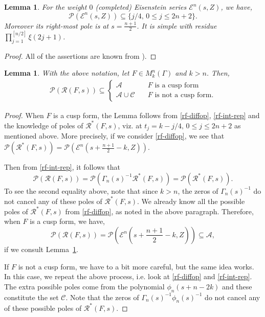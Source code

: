 \documentclass[12pt]{amsart}
\numberwithin{equation}{section}
\theoremstyle{plain}
\newtheorem{lem}[thm]{Lemma}
\theoremstyle{definition}
\newcommand{\q}{\quad}
\newcommand{\mc}{\mathcal}
\newcommand{\mcr}{\mathscr}
\newcommand{\mkngam}{M^n_k(\Gamma)}
\begin{document}
\begin{lem} \label{pole-eisen}
For the weight $0$ (completed) Eisenstein series $\mathscr E^n(s,Z) $, we have,
\[ \mathscr{P}( \mathscr E^n(s,Z) ) \subseteq \{  j/4, \, 0 \le j \le 2n+2 \} . \]
Moreover its right-most pole  is at $s=\frac{n+1}{2}$. It is simple with residue $\prod_{j=1}^{[n/2]} \xi(2j+1)$.
\end{lem}

\begin{proof}
    All of the assertions are known from \cite[Theorem~2]{kalinin-eisen}). 
\end{proof}

\begin{lem} \label{polu}
With the above notation, let $F \in \mkngam$ and $k>n$. Then,
\begin{align}
    \mathscr{P}(\mc R(F,s)) \subseteq \begin{cases}
       \mathscr{A}  \q & F \text{ is a cusp form} \\
       \mathscr{A}  \cup \mathscr{C} \q & F \text{ is not a cusp form}.
    \end{cases}
\end{align}
\end{lem}

\begin{proof}
    When $F$ is a cusp form, the Lemma follows from \eqref{rf-diffop}, \eqref{rf-int-rep} and the knowledge of poles of $\mc R^*(F,s)$, viz. at $t_j=k-j/4, \,   0 \le j \le 2n+2$ as mentioned above. More precisely, if we consider \eqref{rf-diffop}, we see that $\mathscr{P}(\mc R^*(F,s)) = \mathscr{P}( \mathscr E^n(s +\frac{n+1}{2}-k,Z) )$. 
    
    Then from \eqref{rf-int-rep}, it follows that 
    \[ \mathscr{P}(\mc R(F,s)) = \mathscr{P}( \Gamma_n(s)^{-1} \mc R^*(F,s)) =\mathscr{P}(\mc R^*(F,s)) . \]
    To see the second equality above, note that since $k>n$, the zeros of $\Gamma_n(s)^{-1}$ do not cancel any of these poles of $\mc R^*(F,s)$. We already know all the possible poles of $\mc R^*(F,s)$ from \eqref{rf-diffop}, as noted in the above paragraph. Therefore, when $F$ is a cusp form, we have,
    \[  \mathscr{P}(\mc R(F,s)) =  \mathscr{P}( \mathscr E^n(s +\frac{n+1}{2}-k,Z) ) \subseteq \mcr A,\]
if we consult Lemma~\ref{pole-eisen}.

    If $F$ is not a cusp form, we have to a bit more careful, but the same idea works. In this case, we repeat the above process, i.e. look at \eqref{rf-diffop} and \eqref{rf-int-rep}. The extra possible poles come from the polynomial $\phi_n(s+n-2k)$ and these constitute the set $\mcr C$. Note that the zeros of $\Gamma_n(s)^{-1} \phi_n(s)^{-1}$ do not cancel any of these possible poles of $\mc R^*(F,s)$.
\end{proof}
\end{document}
